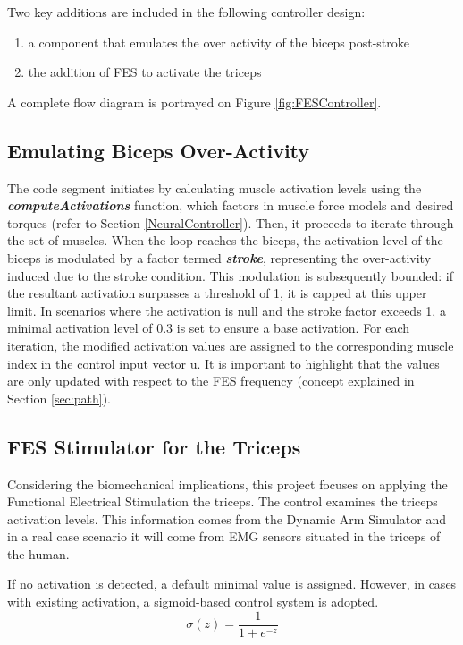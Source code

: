 Two key additions are included in the following controller design:

\begin{enumerate}
    \item a component that emulates the over activity of the biceps post-stroke 
    \item the addition of FES to activate the triceps
\end{enumerate}

A complete flow diagram is portrayed on Figure \ref{fig:FESController}.

\subsection{Emulating Biceps Over-Activity}

The code segment initiates by calculating muscle activation levels using the \textbf{\textit{computeActivations}} function, which factors in muscle force models and desired torques  (refer to Section \ref{NeuralController}). Then, it proceeds to iterate through the set of  muscles. When the loop reaches the biceps, the activation level of the biceps is modulated by a factor termed \textbf{\textit{stroke}}, representing the over-activity induced due to the stroke condition. This modulation is subsequently bounded: if the resultant activation surpasses a threshold of 1, it is capped at this upper limit. In scenarios where the activation is null and the stroke factor exceeds 1, a minimal activation level of 0.3 is set to ensure a base activation. For each iteration, the modified activation values are assigned to the corresponding muscle index in the control input vector u. It is important to highlight that the values are only updated with respect to the FES frequency (concept explained in Section \ref{sec:path}).

\subsection{FES Stimulator for the Triceps}

Considering the biomechanical implications, this project focuses on applying the Functional Electrical Stimulation the triceps. The control examines the triceps activation levels. This information comes from the Dynamic Arm Simulator and in a real case scenario it will come from EMG sensors situated in the triceps of the human. 

If no activation is detected, a default minimal value is assigned. However, in cases with existing activation, a sigmoid-based control system is adopted. 
\begin{equation}\label{sigmoid}
    \sigma(z) = \frac{1}{1 + e^{-z}}
\end{equation}

